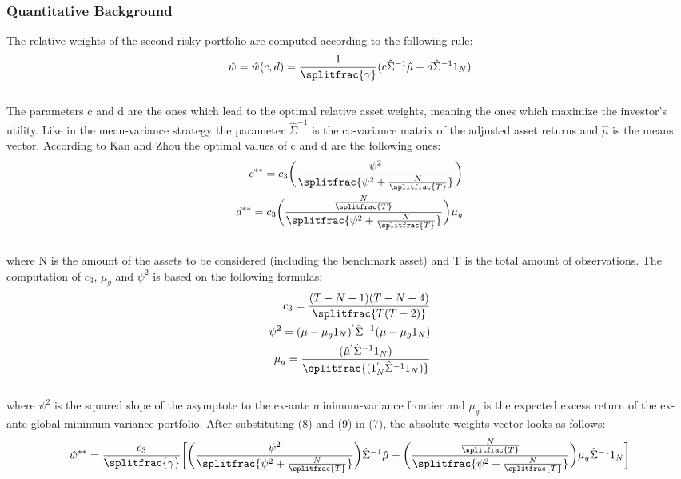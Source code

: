 \documentclass{article}
\begin{document}
\subsubsection{Quantitative Background}
The relative weights of the second risky portfolio are computed according to the following rule:\\
\begin{align}
\hat{w} = \hat{w}(c,d) = \frac{1}{\splitfrac{\gamma}}(c\hat{\Sigma}^{-1}\hat{\mu} +
d\hat{\Sigma}^{-1}1_{N})   
\end{align}\\
The parameters c and d are the ones which lead to the optimal relative asset weights, meaning the ones which maximize the investor's utility. Like in the mean-variance strategy the parameter $\hat{\Sigma}^{-1}$ is the co-variance matrix of the adjusted asset returns and $\hat{\mu}$ is the means vector. According to Kan and Zhou the optimal values of c and d are the following ones:\\
\begin{align}
c^{**} = c_{3}\bigg(\frac{\psi^{2}}{\splitfrac{\psi^{2} + \frac{N}{\splitfrac{T}}}}\bigg) \\
d^{**} = c_{3}\bigg(\frac{\frac{N}{\splitfrac{T}}}{\splitfrac{\psi^{2} + \frac{N}{\splitfrac{T}}}}\bigg)\mu_{g} 
\end{align}\\
where N is the amount of the assets to be considered (including the benchmark asset) and T is the total amount of observations. The computation of $c_{3}$, $\mu_{g}$ and $\psi^{2}$ is based on the following formulas:\\
\begin{align}
c_{3} = \frac{(T-N-1)(T-N-4)}{\splitfrac{T(T-2)}} \\
\psi^{2} = (\mu - \mu_{g}1_{N})^{'}\hat{\Sigma}^{-1}(\mu - \mu_{g}1_{N})\\
\mu_{g} = \frac{(\hat{\mu}^{'}\hat{\Sigma}^{-1}1_{N})}{\splitfrac{(1^{'}_{N}\hat{\Sigma}^{-1}1_{N})}}  
\end{align}\\
where $\psi^{2}$ is the squared slope of the asymptote to the ex-ante minimum-variance frontier and $\mu_{g}$ is the expected excess return of the ex-ante global minimum-variance portfolio. After substituting (8) and (9) in (7), the absolute weights vector looks as follows:\\

\begin{align}
\hat{w}^{**} = \frac{c_{3}}{\splitfrac{\gamma}}\bigg[\bigg(\frac{\psi^{2}}{\splitfrac{\psi^{2}+\frac{N}{\splitfrac{T}}}}\bigg)\hat{\Sigma}^{-1}\hat{\mu} + \bigg(\frac{\frac{N}{\splitfrac{T}}}{\splitfrac{\psi^{2}+\frac{N}{\splitfrac{T}}}}\bigg)\mu_{g}\hat{\Sigma}^{-1}1_{N}\bigg]   
\end{align}
\end{document}
